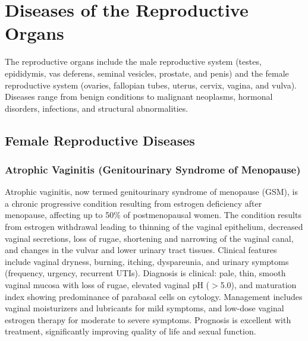 \chapter{Diseases of the Reproductive Organs}
\label{ch:reproductive}
The reproductive organs include the male reproductive system (testes, epididymis, vas deferens, seminal vesicles, prostate, and penis) and the female reproductive system (ovaries, fallopian tubes, uterus, cervix, vagina, and vulva). Diseases range from benign conditions to malignant neoplasms, hormonal disorders, infections, and structural abnormalities.

\section{Female Reproductive Diseases}








\label{sec:Female Reproductive Diseases}

\subsection{Atrophic Vaginitis (Genitourinary Syndrome of Menopause)}
\label{sec:Atrophic Vaginitis}
Atrophic vaginitis, now termed genitourinary syndrome of menopause (GSM), is a chronic progressive condition resulting from estrogen deficiency after menopause, affecting up to 50\% of postmenopausal women. The condition results from estrogen withdrawal leading to thinning of the vaginal epithelium, decreased vaginal secretions, loss of rugae, shortening and narrowing of the vaginal canal, and changes in the vulvar and lower urinary tract tissues. Clinical features include vaginal dryness, burning, itching, dyspareunia, and urinary symptoms (frequency, urgency, recurrent UTIs). Diagnosis is clinical: pale, thin, smooth vaginal mucosa with loss of rugae, elevated vaginal pH ($>$5.0), and maturation index showing predominance of parabasal cells on cytology. Management includes vaginal moisturizers and lubricants for mild symptoms, and low-dose vaginal estrogen therapy for moderate to severe symptoms. Prognosis is excellent with treatment, significantly improving quality of life and sexual function.

